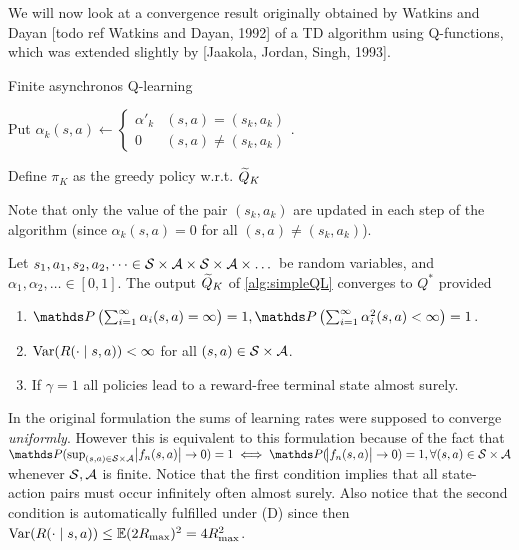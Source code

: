 We will now look at a convergence result originally obtained by Watkins and Dayan
[todo ref Watkins and Dayan, 1992] of a TD algorithm using Q-functions,
which was extended slightly by [Jaakola, Jordan, Singh, 1993].

\begin{algorithm}[H] %
  \caption{Finite asynchronos Q-learning}
  Put $\alpha_k(s, a) \leftarrow \begin{cases}
    \alpha'_k & (s, a) = (s_k, a_k)
    \\ 0 & (s, a) \neq (s_k, a_k)
  \end{cases}$.

  Define $\pi_K$ as the greedy policy w.r.t. $\widetilde{Q}_K$ \\
  \label{alg:finAsyncQL}
\end{algorithm}
Note that only the value of the pair $(s_k, a_k)$ are updated in each
step of the algorithm
(since $\alpha_k(s, a) = 0$ for all $(s,a)\neq(s_k, a_k)$).

\begin{thm} %
  Let $s_1, a_1, s_2, a_2, \dots \in
  \mathcal{S} \times \mathcal{A} \times \mathcal{S} \times \mathcal{A} \times \dots$
  be random variables, and $\alpha_1, \alpha_2, \dots \in [0,1]$.
  The output $\widetilde{Q}_K$ of \cref{alg:simpleQL} converges to $Q^*$
  provided
  \begin{enumerate}
    \item $\Prob\left(\sum_{i=1}^\infty \alpha_i(s,a) = \infty\right) = 1,
      \Prob\left(\sum_{i=1}^\infty \alpha_i^2(s,a) < \infty\right) = 1$.
    \item $\mathrm{Var}(R(\cdot \mid s, a)) < \infty$ for all $(s, a) \in
      \mathcal{S}\times\mathcal{A}$.
    \item If $\gamma = 1$ all policies lead to a reward-free terminal
      state almost surely.
  \end{enumerate}
\end{thm}
In the original formulation the sums of learning rates were supposed to
converge \emph{uniformly}. However this is equivalent to this formulation
because of the fact that
$\Prob(\sup_{(s, a) \in \Cal{S} \times \Cal{A}} \abs{f_n(s, a)} \to 0) = 1 \iff
\Prob(\abs{f_n(s, a)} \to 0) = 1, \forall (s, a) \in \Cal{S} \times \Cal{A}$
whenever $\mathcal{S}, \mathcal{A}$ is finite.
Notice that the first condition implies that all state-action pairs
must occur infinitely often almost surely.
Also notice that the second condition is automatically fulfilled under
(D) since then $\mathrm{Var}(R(\cdot \mid s, a)) \leq \mathbb{E} (2R_{\max})^2 = 4 R_{\max}^2$.

